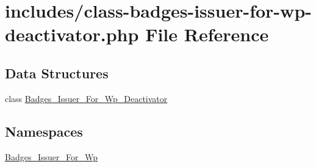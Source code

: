 \hypertarget{class-badges-issuer-for-wp-deactivator_8php}{}\section{includes/class-\/badges-\/issuer-\/for-\/wp-\/deactivator.php File Reference}
\label{class-badges-issuer-for-wp-deactivator_8php}
\subsection*{Data Structures}
\begin{DoxyCompactItemize}
\item 
class \hyperlink{class_badges___issuer___for___wp___deactivator}{Badges\+\_\+\+Issuer\+\_\+\+For\+\_\+\+Wp\+\_\+\+Deactivator}
\end{DoxyCompactItemize}
\subsection*{Namespaces}
\begin{DoxyCompactItemize}
\item 
 \hyperlink{namespace_badges___issuer___for___wp}{Badges\+\_\+\+Issuer\+\_\+\+For\+\_\+\+Wp}
\end{DoxyCompactItemize}

